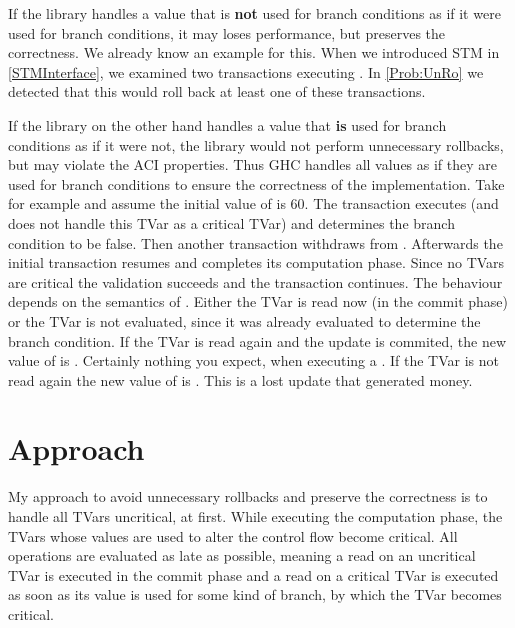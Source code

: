 If the library handles a value that is \textbf{not} used for branch conditions as if it were used for branch conditions, 
it may loses performance, but preserves the correctness. We already know an example for this. When we introduced
STM in \ref{STMInterface}, we examined two transactions executing . In \ref{Prob:UnRo} we detected
that this would roll back at least one of these transactions. 


If the library on the other hand handles a value that \textbf{is}
used for branch conditions as if it were not, the library would not perform unnecessary rollbacks, but may violate 
the ACI properties. Thus GHC handles all values as if they are used for branch conditions to ensure the correctness 
of the implementation. Take for example  and assume the initial value of  is 60. 
The transaction executes  (and does not handle this TVar as a critical TVar) and determines the 
branch condition to be false. Then another transaction withdraws  from . Afterwards the initial  
transaction resumes and completes its computation phase. Since no TVars are critical the validation succeeds and
the transaction continues. The behaviour depends on the semantics of . Either the TVar is read now
(in the commit phase) or the TVar is not evaluated, since it was already evaluated to determine the branch condition.
If the TVar is read again and the update is commited, the new value of  is . Certainly nothing
you expect, when executing a . If the TVar is not read again the new value of  is
. This is a lost update that generated money. 

\section{Approach}
My approach to avoid unnecessary rollbacks and preserve the correctness is to handle all TVars uncritical, at first. 
While executing the computation 
phase, the TVars whose values are used to alter the control flow become critical. All  operations are
evaluated as late as possible, meaning a read on an uncritical TVar is executed in the commit phase and a read on 
a critical TVar is executed as soon as its value is used for some kind of branch, by which the TVar becomes critical.

